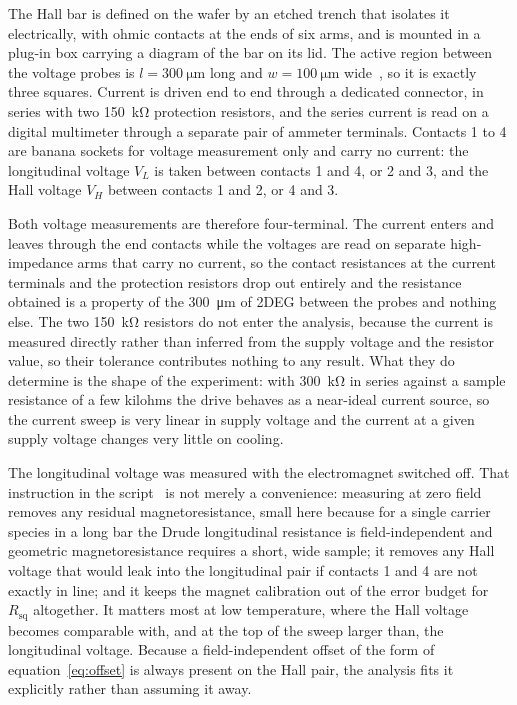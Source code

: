 \documentclass[11pt,a4paper]{article}
\newcommand{\Rsq}{R_{\mathrm{sq}}}
\begin{document}
The Hall bar is defined on the wafer by an etched trench that isolates it electrically, with
ohmic contacts at the ends of six arms, and is mounted in a plug-in box carrying a diagram
of the bar on its lid. The active region between the voltage probes is
$l = \qty{300}{\micro\metre}$ long and $w = \qty{100}{\micro\metre}$ wide~\cite{script}, so
it is exactly three squares. Current is driven end to end through a dedicated connector, in
series with two \qty{150}{\kilo\ohm} protection resistors, and the series current is read on
a digital multimeter through a separate pair of ammeter terminals. Contacts 1 to 4 are
banana sockets for voltage measurement only and carry no current: the longitudinal voltage
$V_L$ is taken between contacts 1 and 4, or 2 and 3, and the Hall voltage $V_H$ between
contacts 1 and 2, or 4 and 3.

Both voltage measurements are therefore four-terminal. The current enters and leaves through
the end contacts while the voltages are read on separate high-impedance arms that carry no
current, so the contact resistances at the current terminals and the protection resistors
drop out entirely and the resistance obtained is a property of the \qty{300}{\micro\metre}
of 2DEG between the probes and nothing else. The two \qty{150}{\kilo\ohm} resistors do not
enter the analysis, because the current is measured directly rather than inferred from the
supply voltage and the resistor value, so their tolerance contributes nothing to any result.
What they do determine is the shape of the experiment: with \qty{300}{\kilo\ohm} in series
against a sample resistance of a few kilohms the drive behaves as a near-ideal current
source, so the current sweep is very linear in supply voltage and the current at a given
supply voltage changes very little on cooling.

The longitudinal voltage was measured with the electromagnet switched off. That instruction
in the script~\cite{script} is not merely a convenience: measuring at zero field removes any
residual magnetoresistance, small here because for a single carrier species in a long bar the
Drude longitudinal resistance is field-independent and geometric magnetoresistance requires a
short, wide sample; it removes any Hall voltage that would leak into the longitudinal pair if
contacts 1 and 4 are not exactly in line; and it keeps the magnet calibration out of the error
budget for $\Rsq$ altogether. It matters most at low temperature, where the Hall voltage
becomes comparable with, and at the top of the sweep larger than, the longitudinal voltage.
Because a field-independent offset of the form of equation~\eqref{eq:offset} is always
present on the Hall pair, the analysis fits it explicitly rather than assuming it away.
\end{document}
